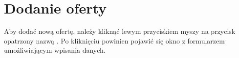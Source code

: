 \section{Dodanie oferty}
Aby dodać nową ofertę, należy kliknąć lewym przyciskiem myszy na przycisk opatrzony nazwą . Po kliknięciu powinien pojawić się okno z formularzem umożliwiającym wpisania danych.\\
\\
\begin{minipage}{\linewidth}
\label{add-offer1}
\end{minipage}\\

